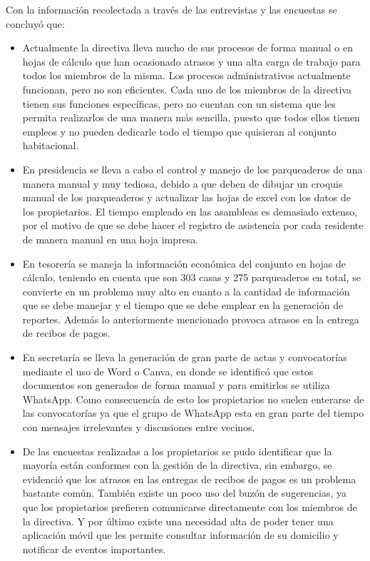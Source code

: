 Con la información recolectada a través de las entrevistas y las encuestas se concluyó que:
\begin{itemize}
    \item Actualmente la directiva lleva mucho de sus procesos de forma manual o en hojas de cálculo que han ocasionado atrasos y una alta carga de trabajo para todos los miembros de la misma.
    Los procesos administrativos actualmente funcionan, pero no son eficientes.
    Cada uno de los miembros de la directiva tienen sus funciones específicas, pero no cuentan con un sistema que les permita realizarlos de una manera más sencilla, puesto que todos ellos tienen empleos y no pueden dedicarle todo el tiempo que quisieran al conjunto habitacional.
    \item En presidencia se lleva a cabo el control y manejo de los parqueaderos de una manera manual y muy tediosa, debido a que deben de dibujar un croquis manual de los parqueaderos y actualizar las hojas de excel con los datos de los propietarios. El tiempo empleado en las asambleas es demasiado extenso, por el motivo de que se debe hacer el registro de asistencia por cada residente de manera manual en una hoja impresa.
    \item En tesorería se maneja la información económica del conjunto en hojas de cálculo, teniendo en cuenta que son 303 casas y 275 parqueaderos en total, se convierte en un problema muy alto en cuanto a la cantidad de información que se debe manejar y el tiempo que se debe emplear en la generación de reportes. Además lo anteriormente mencionado provoca atrasos en la entrega de recibos de pagos.
    \item En secretaría se lleva la generación de gran parte de actas y convocatorías mediante el uso de Word o Canva, en donde se identificó que estos documentos son generados de forma manual y para emitirlos se utiliza WhatsApp. Como consecuencía de esto los propietarios no suelen enterarse de las convocatorías ya que el grupo de  WhatsApp esta en gran parte del tiempo con mensajes irrelevantes y discusiones entre vecinos.
    \item De las encuestas realizadas a los propietarios se pudo identificar que la mayoría están conformes con la gestión de la directiva, sin embargo, se
     evidenció que los atrasos en las entregas de recibos de pagos es un problema bastante común. También existe un poco uso del buzón de sugerencias, ya que los propietarios prefieren comunicarse directamente con los miembros de la directiva. Y por último existe una necesidad alta de poder tener una aplicación móvil que les permite consultar información de su domicilio y notificar de eventos importantes.
\end{itemize}